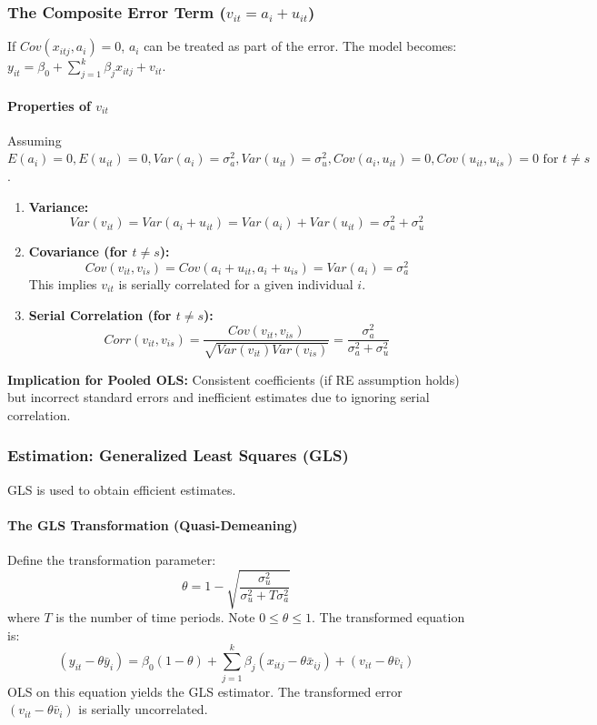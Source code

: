 \documentclass[a4paper, 10pt]{article}
\theoremstyle{definition}	%
\begin{document}
\subsubsection{The Composite Error Term (\(v_{it} = a_i + u_{it}\))}
If \(Cov(x_{itj}, a_i) = 0\), \(a_i\) can be treated as part of the error.
The model becomes: \(y_{it} = \beta_0 + \sum_{j=1}^{k} \beta_j x_{itj} + v_{it}\).

\paragraph{Properties of \(v_{it}\)}
Assuming \(E(a_i)=0, E(u_{it})=0, Var(a_i)=\sigma_a^2, Var(u_{it})=\sigma_u^2, Cov(a_i, u_{it})=0, Cov(u_{it}, u_{is})=0 \text{ for } t \neq s\).
\begin{enumerate}
    \item \textbf{Variance:}
    \[ Var(v_{it}) = Var(a_i + u_{it}) = Var(a_i) + Var(u_{it}) = \sigma_a^2 + \sigma_u^2 \]
    \item \textbf{Covariance (for \(t \neq s\)):}
    \[ Cov(v_{it}, v_{is}) = Cov(a_i + u_{it}, a_i + u_{is}) = Var(a_i) = \sigma_a^2 \]
    This implies \(v_{it}\) is serially correlated for a given individual \(i\).
    \item \textbf{Serial Correlation (for \(t \neq s\)):}
    \[ Corr(v_{it}, v_{is}) = \frac{Cov(v_{it}, v_{is})}{\sqrt{Var(v_{it})Var(v_{is})}} = \frac{\sigma_a^2}{\sigma_a^2 + \sigma_u^2} \]
\end{enumerate}
\textbf{Implication for Pooled OLS:} Consistent coefficients (if RE assumption holds) but incorrect standard errors and inefficient estimates due to ignoring serial correlation.

\subsubsection{Estimation: Generalized Least Squares (GLS)}
GLS is used to obtain efficient estimates.
\paragraph{The GLS Transformation (Quasi-Demeaning)}
Define the transformation parameter:
\begin{equation} \label{eq:theta_re}
\theta = 1 - \sqrt{\frac{\sigma_u^2}{\sigma_u^2 + T\sigma_a^2}}
\end{equation}
where \(T\) is the number of time periods. Note \(0 \le \theta \le 1\).
The transformed equation is:
\begin{equation} \label{eq:re_transformed}
(y_{it} - \theta \bar{y}_i) = \beta_0(1-\theta) + \sum_{j=1}^{k} \beta_j (x_{itj} - \theta \bar{x}_{ij}) + (v_{it} - \theta \bar{v}_i)
\end{equation}
OLS on this equation yields the GLS estimator. The transformed error \((v_{it} - \theta \bar{v}_i)\) is serially uncorrelated.
\end{document}
